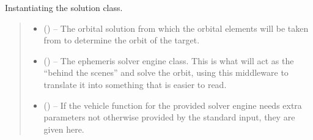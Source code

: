 \documentclass[letterpaper,11pt,english]{sphinxmanual}
\begin{document}
\begin{savenotes}
\begin{fulllineitems}
\begin{savenotes}\begin{fulllineitems}
\label{\detokenize{code/opihiexarata.ephemeris.solution:opihiexarata.ephemeris.solution.EphemeriticSolution.__init__}}
\pysigstartsignatures
{}
\pysigstopsignatures
\sphinxAtStartPar
Instantiating the solution class.
\begin{quote}\begin{description}
\begin{itemize}
\item {} 
\sphinxAtStartPar
{} ({\hyperref[\detokenize{code/opihiexarata.orbit.solution:opihiexarata.orbit.solution.OrbitalSolution}]{}}) – The orbital solution from which the orbital elements will be taken
from to determine the orbit of the target.

\item {} 
\sphinxAtStartPar
{} ({\hyperref[\detokenize{code/opihiexarata.library.engine:opihiexarata.library.engine.EphemerisEngine}]{}}) – The ephemeris solver engine class. This is what will act as the
“behind the scenes” and solve the orbit, using this middleware to
translate it into something that is easier to read.

\item {} 
\sphinxAtStartPar
{} () – If the vehicle function for the provided solver engine needs
extra parameters not otherwise provided by the standard input,
they are given here.

\end{itemize}


\end{description}
\end{quote}
\end{fulllineitems}
\end{savenotes}
\end{fulllineitems}
\end{savenotes}
\end{document}
